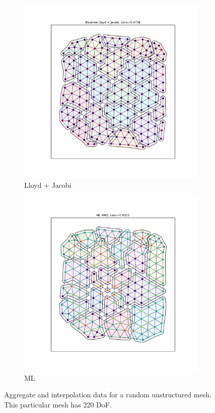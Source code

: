 \documentclass{article}
\begin{document}
\begin{figure}[h]
  \centering
  \begin{subfigure}[t]{0.49\textwidth}
    \centering
    \includegraphics[width=\textwidth, trim=80 70 70 50, clip]{grid_700_lloyd.pdf}
    \caption{Lloyd + Jacobi}
  \end{subfigure}
  \begin{subfigure}[t]{0.49\textwidth}
    \centering
    \includegraphics[width=\textwidth, trim=80 70 70 50, clip]{grid_700_ml.pdf}
    \caption{ML}
  \end{subfigure}
  \caption{Aggregate and interpolation data for a random unstructured mesh.  This particular mesh has 220 DoF.}
  \label{fig:grid700}
\end{figure}
\end{document}
